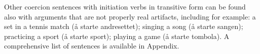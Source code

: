 \documentclass{article}
\begin{document}
Other coercion sentences with initiation verbs in transitive form can be found also with arguments that are not properly real artifacts, including for example: a set in a tennis match (å starte andresettet); singing a song (å starte sangen); practicing a sport (å starte sport); playing a game (å starte tombola). A comprehensive list of sentences is available in Appendix. 

% 
 



\end{document}
